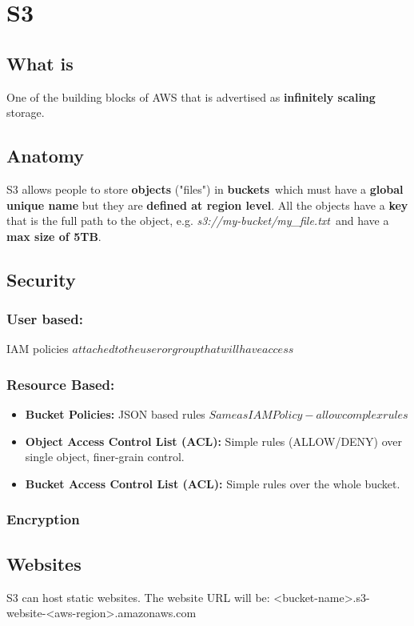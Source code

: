 \section{S3}\label{sec:s3}

\subsection{What is}\label{subsec:what-is-s3}
One of the building blocks of AWS that is advertised as \textbf{infinitely scaling} storage.

\subsection{Anatomy}\label{subsec:anatomy}
S3 allows people to store \textbf{objects} ("files") in \textbf{buckets}\, which must have a \textbf{global unique name} but they are \textbf{defined at region level}\@.
All the objects have a \textbf{key} that is the full path to the object, e.g. \textit{s3://my-bucket/my\_file.txt}\, and have a \textbf{max size of 5TB}\@.

\subsection{Security}\label{subsec:security}

\subsubsection{User based:} IAM policies \(attached to the user or group that will have access\)
\subsubsection{Resource Based:}
\begin{itemize}
	\item \textbf{Bucket Policies:} JSON based rules \(Same as IAM Policy - allow complex rules\)
	\item \textbf{Object Access Control List (ACL):} Simple rules (ALLOW/DENY) over single object, finer-grain control.
	\item \textbf{Bucket Access Control List (ACL):} Simple rules over the whole bucket.
\end{itemize}
\subsubsection{Encryption}

\subsection{Websites}\label{subsec:websites}
S3 can host static websites.
The website URL will be: <bucket-name>.s3-website-<aws-region>.amazonaws.com

